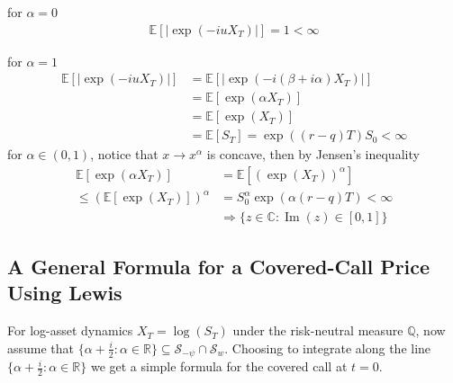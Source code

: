 for $\alpha =0$
\begin{align}
\mathbb{E}[|\exp(-iuX_T)|]=1<\infty
\end{align}

for $\alpha = 1$
\begin{align}
\mathbb{E}[|\exp(-iuX_T)|]&=\mathbb{E}[|\exp(-i(\beta+i\alpha)X_T)|]\\
&=\mathbb{E}[\exp(\alpha X_T)]\\
&=\mathbb{E}[\exp(X_T)]\\
&=\mathbb{E}[S_T]=\exp((r-q)T)S_0<\infty
\end{align}
for $\alpha\in (0,1)$, notice that $x\to x^\alpha$ is concave, then by Jensen's inequality
\begin{align}
\mathbb{E}[\exp(\alpha X_T)]&=\mathbb{E}[(\exp(X_T))^\alpha ]\\
\leq (\mathbb{E}[\exp(X_T)])^\alpha &= S_0^\alpha  \exp(\alpha (r-q)T)<\infty\\
&\Rightarrow \{z\in \mathbb{C} : \operatorname{Im}(z)\in[0,1]\}
\end{align}



\subsection{A General Formula for a Covered-Call Price Using Lewis}
For log-asset dynamics $X_T=\log(S_T)$ under the risk-neutral measure $\mathbb{Q}$,
now assume that
$\{\alpha +\frac{i}{2} : \alpha\in\mathbb{R}\}\subseteq \mathcal{S}_{-\psi} \cap \mathcal{S}_w$. Choosing to integrate along the line $\{\alpha +\frac{i}{2} : \alpha\in\mathbb{R}\}$ we get a simple formula for the covered call at $t=0$.

